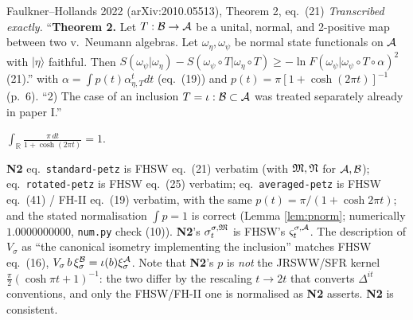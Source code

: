 \documentclass[11pt]{article}
\newcommand{\NII}{\textbf{N2}}
\newcommand{\loc}[1]{{\small\texttt{#1}}}
\newcommand{\1}{\mathbf 1}
\begin{document}
\begin{citedbox}{Faulkner--Hollands 2022 (arXiv:2010.05513), Theorem 2, eq.~(21)}
\emph{Transcribed exactly.} ``\textbf{Theorem 2.} Let $T:\mathcal B\to\mathcal A$ be a unital, normal, and
2-positive map between two v.\ Neumann algebras. Let $\omega_\eta,\omega_\psi$ be normal state
functionals on $\mathcal A$ with $|\eta\rangle$ faithful. Then
$S(\omega_\psi|\omega_\eta)-S(\omega_\psi\circ T|\omega_\eta\circ T)\ge-\ln F(\omega_\psi|\omega_\psi\circ T\circ\alpha)^2$ (21).''
with $\alpha=\int p(t)\alpha^t_{\eta,T}dt$ (eq.~(19)) and $p(t)=\pi[1+\cosh(2\pi t)]^{-1}$ (p.~6).
``2) The case of an inclusion $T=\iota:\mathcal B\subset\mathcal A$ was treated separately already in paper I.''\\[2pt]
\end{citedbox}

\begin{lemma}[normalisation of $p$]\label{lem:pnorm}
$\int_{\mathbb R}\frac{\pi\,dt}{1+\cosh(2\pi t)}=1$.
\end{lemma}

\begin{verdictok}
\NII{} eq.~\loc{standard-petz} is FHSW eq.~(21) verbatim (with $\mathfrak M,\mathfrak N$ for $\mathcal A,\mathcal B$);
eq.~\loc{rotated-petz} is FHSW eq.~(25) verbatim;
eq.~\loc{averaged-petz} is FHSW eq.~(41) / FH-II eq.~(19) verbatim, with the same
$p(t)=\pi/(1+\cosh2\pi t)$; and the stated normalisation $\int p=1$ is correct (Lemma \ref{lem:pnorm};
numerically $1.0000000000$, \loc{num.py} check (10)). \NII's $\sigma^{\sigma,\mathfrak M}_t$ is FHSW's
$\varsigma^{\sigma,\mathcal A}_t$. The description of $V_\sigma$ as ``the canonical isometry implementing the
inclusion'' matches FHSW eq.~(16), $V_\sigma\,b\,\xi^{\mathcal B}_\sigma=\iota(b)\xi^{\mathcal A}_\sigma$.
Note that \NII's $p$ is \emph{not} the JRSWW/SFR kernel $\frac\pi2(\cosh\pi t+1)^{-1}$: the two differ
by the rescaling $t\to2t$ that converts $\Delta^{it}$ conventions, and only the FHSW/FH-II one is
normalised as \NII{} asserts. \NII{} is consistent.
\end{verdictok}
\end{document}

